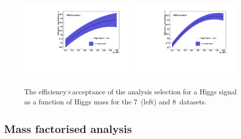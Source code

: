 \begin{figure}
  \includegraphics[width=0.49\textwidth]{ch5_anal_and_results/plots/effAcc7TeV.pdf}
  \includegraphics[width=0.49\textwidth]{ch5_anal_and_results/plots/effAcc8TeV.pdf}
  \caption{The efficiency$\times$acceptance of the analysis selection for a \SM Higgs signal as a function of Higgs mass for the 7~\TeV (left) and 8~\TeV datasets.}
  \label{fig:effacc}
\end{figure}

\subsection{Mass factorised analysis}
\label{sec:signal_mfm}


